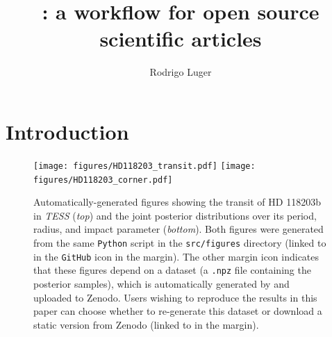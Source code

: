 \documentclass[twocolumn]{aastex631}
\begin{document}
\title{\showyourwork: a workflow for open source scientific articles}

\author[0000-0002-0296-3826]{Rodrigo Luger}

\begin{abstract}
    \blindtext
\end{abstract}

\section{Introduction}
\Blindtext[4]


\begin{figure}[ht!]
    \begin{centering}
        \texttt{[image: figures/HD118203\_transit.pdf]}
        \texttt{[image: figures/HD118203\_corner.pdf]}
        \caption{
            Automatically-generated figures showing the transit of HD 118203b in \emph{TESS} (\emph{top}) and the joint posterior distributions over its period, radius, and impact parameter (\emph{bottom}). Both figures were generated from the same \texttt{Python} script in the \texttt{src/figures} directory (linked to in the \texttt{GitHub} icon in the margin). The other margin icon indicates that these figures depend on a dataset (a \texttt{.npz} file containing the posterior samples), 
            which is automatically generated by \showyourwork and uploaded to Zenodo. Users wishing to reproduce the results in this paper can choose whether to re-generate this dataset or download a static version from Zenodo (linked to in the margin).
        }
        \label{fig:HD118203}
    \end{centering}
\end{figure}
\end{document}
